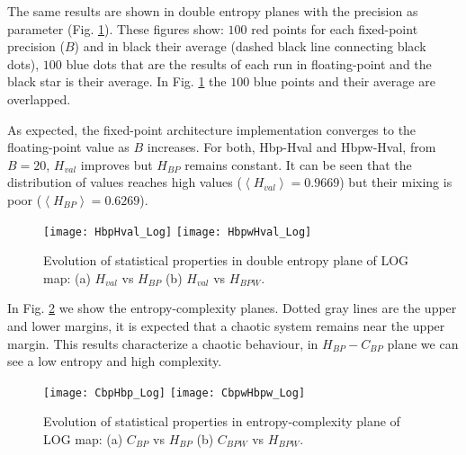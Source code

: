 The same results are shown in double entropy planes with the precision as parameter (Fig. \ref{fig:LOG_HH}).
These figures show: $100$ red points for each fixed-point precision ($B$) and in black their average (dashed black line connecting black dots), $100$ blue dots that are the results of each run in floating-point and the black star is their average.
In Fig. \ref{fig:LOG_HH} the $100$ blue points and their average are overlapped.

As expected, the fixed-point architecture implementation converges to the floating-point value as $B$ increases.
For both, Hbp-Hval and Hbpw-Hval, from $B=20$, $H_{val}$ improves but $H_{BP}$ remains constant.
It can be seen that the distribution of values reaches high values ($\left\langle H_{val}\right\rangle =0.9669$) but their mixing is poor ($\left\langle H_{BP}\right\rangle =0.6269$).

\begin{figure}
	\texttt{[image: HbpHval\_Log]}
	\texttt{[image: HbpwHval\_Log]}
	\caption{Evolution of statistical properties in double entropy plane of LOG map: (a) $H_{val}$ vs $H_{BP}$ (b) $H_{val}$ vs $H_{BPW}$.}
	\label{fig:LOG_HH}
\end{figure}

In Fig. \ref{fig:LOG_HC} we show the entropy-complexity planes.
Dotted gray lines are the upper and lower margins, it is expected that a chaotic system remains near the upper margin.
This results characterize a chaotic behaviour, in $H_{BP}-C_{BP}$ plane we can see a low entropy and high complexity.

\begin{figure}
	\texttt{[image: CbpHbp\_Log]}
	\texttt{[image: CbpwHbpw\_Log]}
	\caption{Evolution of statistical properties in entropy-complexity plane of LOG map: (a) $C_{BP}$ vs $H_{BP}$ (b) $C_{BPW}$ vs $H_{BPW}$.}
	\label{fig:LOG_HC}
\end{figure}
